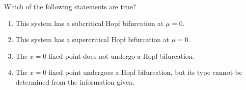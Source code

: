 \documentclass[twoside,10pt,a4paper]{article}
\begin{document}
Which of the following statements are true?

\begin{enumerate}[label=(\alph*)]
	\item This system has a subcritical Hopf bifurcation at $\mu = 0$.
	\item This system has a supercritical Hopf bifurcation at $\mu = 0$.
	\item The $x = 0$ fixed point does not undergo a Hopf bifurcation.
	\item The $x = 0$ fixed point undergoes a Hopf bifurcation, but its type cannot be determined from the information given.
\end{enumerate}
\end{document}
